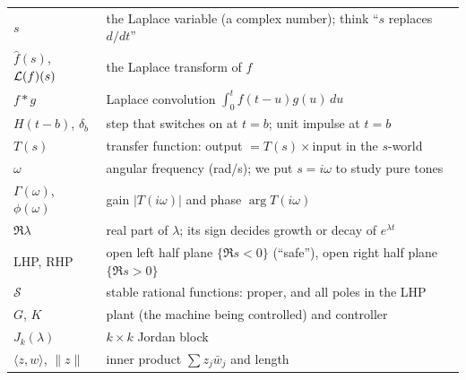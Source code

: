 \begin{center}
\begin{tabular}{@{}p{3.2cm}p{12cm}@{}}
$s$ & the Laplace variable (a complex number); think ``$s$ replaces $d/dt$''\\
$\hat f(s)$, $\mathcal{L}(f)(s)$ & the Laplace transform of $f$\\
$f*g$ & Laplace convolution $\int_0^tf(t-u)g(u)\,du$\\
$H(t-b)$, $\delta_b$ & step that switches on at $t=b$; unit impulse at $t=b$\\
$T(s)$ & transfer function: output $=T(s)\times$input in the $s$-world\\
$\omega$ & angular frequency (rad/s); we put $s=i\omega$ to study pure tones\\
$\Gamma(\omega)$, $\phi(\omega)$ & gain $|T(i\omega)|$ and phase $\arg T(i\omega)$\\
$\Re\lambda$ & real part of $\lambda$; its sign decides growth or decay of $e^{\lambda t}$\\
LHP, RHP & open left half plane $\{\Re s<0\}$ (``safe''), open right half plane $\{\Re s>0\}$\\
$\mathcal S$ & stable rational functions: proper, and all poles in the LHP\\
$G$, $K$ & plant (the machine being controlled) and controller\\
$J_k(\lambda)$ & $k\times k$ Jordan block\\
$\langle z,w\rangle$, $\|z\|$ & inner product $\sum z_j\bar w_j$ and length\\
\bottomrule
\end{tabular}
\end{center}

